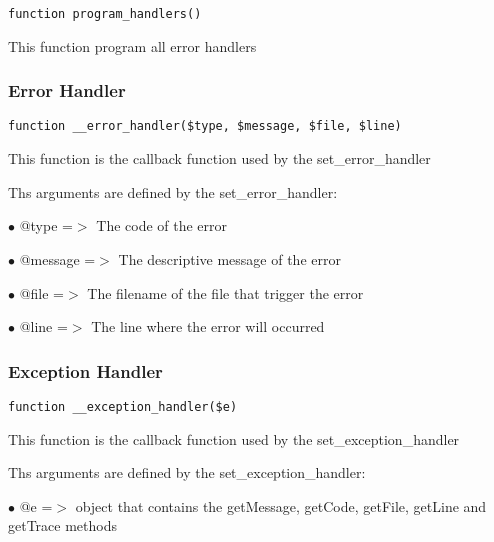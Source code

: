 \documentclass[a4paper]{article}
\begin{document}
\begin{lstlisting}
function program_handlers()
\end{lstlisting}

This function program all error handlers

\hypertarget{toc115}{}
\subsubsection{Error Handler}

\begin{lstlisting}
function __error_handler($type, $message, $file, $line)
\end{lstlisting}

This function is the callback function used by the set\_error\_handler

Ths arguments are defined by the set\_error\_handler:

\begin{compactitem}
\item[\color{myblue}$\bullet$] @type    =$>$ The code of the error
\item[\color{myblue}$\bullet$] @message =$>$ The descriptive message of the error
\item[\color{myblue}$\bullet$] @file    =$>$ The filename of the file that trigger the error
\item[\color{myblue}$\bullet$] @line    =$>$ The line where the error will occurred
\end{compactitem}

\hypertarget{toc116}{}
\subsubsection{Exception Handler}

\begin{lstlisting}
function __exception_handler($e)
\end{lstlisting}

This function is the callback function used by the set\_exception\_handler

Ths arguments are defined by the set\_exception\_handler:

\begin{compactitem}
\item[\color{myblue}$\bullet$] @e =$>$ object that contains the getMessage, getCode, getFile, getLine and getTrace
      methods
\end{compactitem}

\hypertarget{toc117}{}
\end{document}
